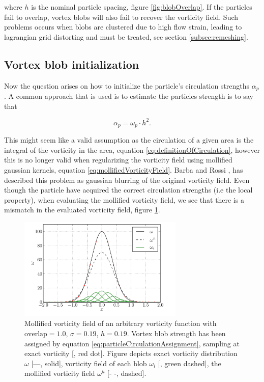 	
where $h$ is the nominal particle spacing, figure \ref{fig:blobOverlap}. If the particles fail to overlap, vortex blobs will also fail to recover the vorticity field. Such problems occurs when blobs are clustered due to high flow strain, leading to lagrangian grid distorting and must be treated, see section \ref{subsec:remeshing}.


\subsection{Vortex blob initialization}

Now the question arises on how to initialize the particle's circulation strengths $\alpha_p$. A common approach that is used is to estimate the particles strength is to say that

	\begin{equation}
	\alpha_p = \omega_p\cdot h^2.
	\label{eq:particleCirculationAssignment}
	\end{equation}

This might seem like a valid assumption as the circulation of a given area is the integral of the vorticity in the area, equation \ref{eq:definitionOfCirculation}, however this is no longer valid when regularizing the vorticity field using mollified gaussian kernels, equation \ref{eq:mollifiedVorticityField}. Barba and Rossi \cite{Barba2010}, has described this problem as gaussian blurring of the original vorticity field. Even though the particle have acquired the correct circulation strengths (i.e the local property), when evaluating the mollified vorticity field, we see that there is a mismatch in the evaluated vorticity field, figure \ref{fig:particleInitialization}. 


	\begin{figure}[t]
	\centering
	\includegraphics[width=0.7\textwidth]{figures/lagrangian/particleInitialization.pdf}
	\caption{Mollified vorticity field of an arbitrary vorticity function with $\mathrm{overlap}=1.0$, $\sigma=0.19$, $h=0.19$. Vortex blob strength has been assigned by equation \ref{eq:particleCirculationAssignment}, sampling at exact vorticity [{\color{plotRed}{$\bullet$}}, red dot]. Figure depicts exact vorticity distribution $\omega$ [---, solid], vorticity field of each blob $\omega_i$ [{\color{darkgreen}{---}}, green dashed], the mollified vorticity field $\omega^h$ [- -, dashed].  }
	\label{fig:particleInitialization}
	\end{figure}

